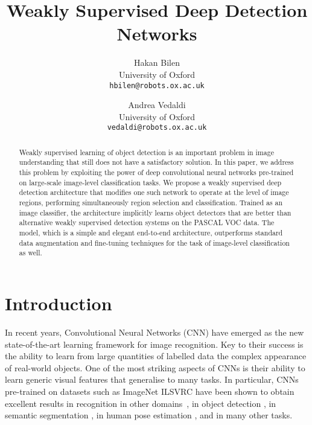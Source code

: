 \documentclass[10pt,twocolumn,letterpaper]{article}
\begin{document}
\title{Weakly Supervised Deep Detection Networks}
\author{Hakan Bilen\\
University of Oxford\\
{\tt\small hbilen@robots.ox.ac.uk}
\and
Andrea Vedaldi\\
University of Oxford\\
{\tt\small vedaldi@robots.ox.ac.uk}
}



\maketitle
\begin{abstract}
Weakly supervised learning of object detection is an important problem in image understanding that still does not have a satisfactory solution.  In this paper, we address this problem by exploiting the power of deep convolutional neural networks pre-trained on large-scale image-level classification tasks. We propose a weakly supervised deep detection architecture that modifies one such network to operate at the level of image regions, performing simultaneously region selection and classification. Trained as an image classifier, the architecture implicitly learns object detectors that are better than alternative weakly supervised detection systems on the PASCAL VOC data. The model, which is a simple and elegant end-to-end architecture, outperforms standard data augmentation and fine-tuning techniques for the task of image-level classification as well.

\end{abstract}

\section{Introduction}\label{s:intro}
In recent years, Convolutional Neural Networks (CNN) \cite{Lecun89} have emerged as the new state-of-the-art learning framework for image recognition. Key to their success is the ability to learn from large quantities of labelled data the complex appearance of real-world objects. One of the most striking aspects of CNNs is their ability to learn generic visual features that generalise to many tasks. In particular, CNNs pre-trained on datasets such as ImageNet ILSVRC have been shown to obtain excellent results in recognition in other domains~\cite{Donahue13}, in object detection \cite{Girshick14}, in semantic segmentation \cite{Hariharan14}, in human pose estimation \cite{Toshev13}, and in many other tasks.
\end{document}
